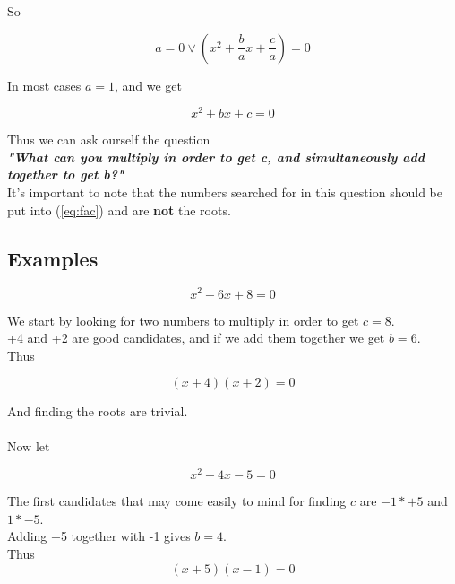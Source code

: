 \documentclass[a4paper]{article}
\begin{document}
So

\begin{equation}  \label{eq:factor}
	a = 0 \vee (x^2 + \frac{b}{a}x + \frac{c}{a}) = 0
\end{equation}

In most cases $a=1$, and we get

\begin{equation}  \label{eq:poly}
	x^2 + bx + c = 0
\end{equation}

Thus we can ask ourself the question\\ \newline \emph{\textbf{"What can you multiply in order to get c, and simultaneously add together to get b?"}}\\

It's important to note that the numbers searched for in this question should be put into (\ref{eq:fac}) and are \textbf{not} the roots.


\newpage

\subsection{Examples}

\begin{equation}  \label{eq:ex1}
	x^2 + 6x + 8 = 0
\end{equation}

We start by looking for two numbers to multiply in order to get $c=8$.\\ +4 and +2 are good candidates, and if we add them together we get $b=6$.\\ Thus

\begin{equation} \label{eq:ex11}
 (x+4)(x+2) = 0
\end{equation}

And finding the roots are trivial.\\ \\
Now let

\begin{equation}  \label{eq:ex2}
	x^2 + 4x - 5  = 0
\end{equation}

The first candidates that may come easily to mind for finding $c$ are $-1*+5$ and $1*-5$.\\ Adding +5 together with -1 gives $b=4$. \\ Thus
\begin{equation} \label{eq:ex21}
 (x+5)(x-1) = 0
\end{equation}
\end{document}
